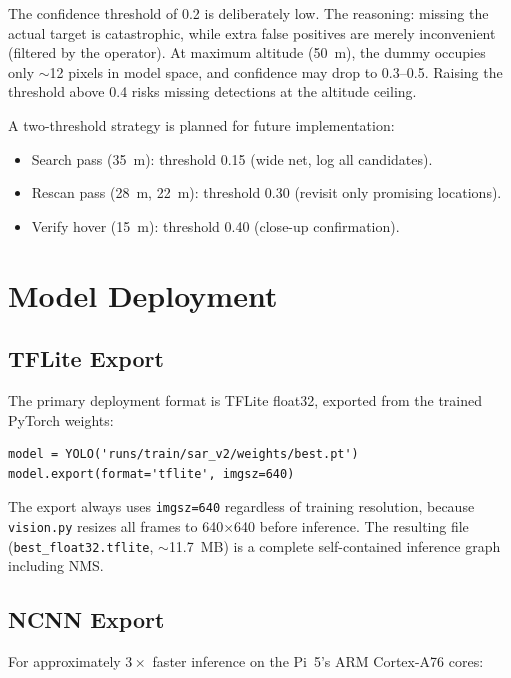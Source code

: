 The confidence threshold of 0.2 is deliberately low. The reasoning: missing the
actual target is catastrophic, while extra false positives are merely inconvenient
(filtered by the operator). At maximum altitude (50~m), the dummy occupies only
$\sim$12 pixels in model space, and confidence may drop to 0.3--0.5. Raising
the threshold above 0.4 risks missing detections at the altitude ceiling.

A two-threshold strategy is planned for future implementation:
\begin{itemize}
    \item Search pass (35~m): threshold 0.15 (wide net, log all candidates).
    \item Rescan pass (28~m, 22~m): threshold 0.30 (revisit only promising locations).
    \item Verify hover (15~m): threshold 0.40 (close-up confirmation).
\end{itemize}


\section{Model Deployment}
\label{sec:model-deployment}

\subsection{TFLite Export}

The primary deployment format is TFLite float32, exported from the trained PyTorch
weights:

\begin{verbatim}
model = YOLO('runs/train/sar_v2/weights/best.pt')
model.export(format='tflite', imgsz=640)
\end{verbatim}

\noindent The export always uses \texttt{imgsz=640} regardless of training resolution,
because \texttt{vision.py} resizes all frames to 640$\times$640 before inference.
The resulting file (\texttt{best\_float32.tflite}, $\sim$11.7~MB) is a complete
self-contained inference graph including NMS.

\subsection{NCNN Export}

For approximately $3\times$ faster inference on the Pi~5's ARM Cortex-A76 cores:

